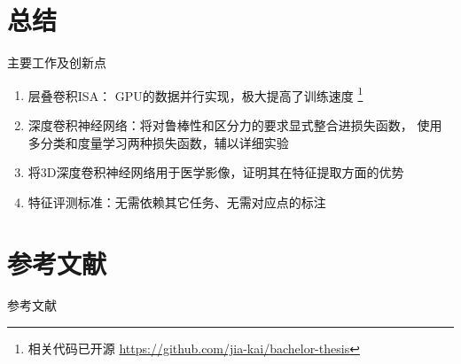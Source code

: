 \documentclass {beamer}
\begin{document}
\section{总结}
\begin{frame}{主要工作及创新点}
    \begin{enumerate}
        \item 层叠卷积ISA：
            GPU的数据并行实现，极大提高了训练速度
            \footnote{相关代码已开源
                \url{https://github.com/jia-kai/bachelor-thesis}}
        \item 深度卷积神经网络：将对鲁棒性和区分力的要求显式整合进损失函数，
            使用多分类和度量学习两种损失函数，辅以详细实验
        \item 将3D深度卷积神经网络用于医学影像，证明其在特征提取方面的优势
        \item 特征评测标准：无需依赖其它任务、无需对应点的标注
    \end{enumerate}
\end{frame}

\section{ }
\subsection{ }

\section[]{参考文献}

\nocite{bay2006surf}
\nocite{bengio2009learning}
\nocite{bengio2013representation}
\nocite{bergstra+al:2010-scipy}
\nocite{dalal2005histograms}
\nocite{dosovitskiy2014discriminative}
\nocite{he2015delving}
\nocite{heimann2009comparison}
\nocite{hinton2015distilling}
\nocite{hornik1989multilayer}
\nocite{hyvarinen2000emergence}
\nocite{hyvarinen2009natural}
\nocite{kingma2014adam}
\nocite{krizhevsky2012imagenet}
\nocite{kuipers1999quaternions}
\nocite{le2011learning}
\nocite{lecun1998gradient}
\nocite{lowe1999object}
\nocite{medimging2}
\nocite{ojala1994performance}
\nocite{peyrat2010registration}
\nocite{schroff2015facenet}
\nocite{scovanner20073}
\nocite{shen2002hammer}
\nocite{sutskever2013importance}
\nocite{wu2013unsupervised}

\begin{frame}[allowframebreaks]{参考文献}
    \printbibliography
\end{frame}
\end{document}
